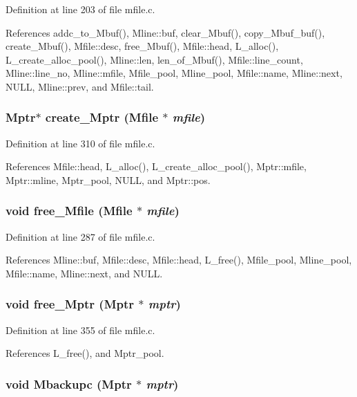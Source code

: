 Definition at line 203 of file mfile.c.

References addc\_\-to\_\-Mbuf(), Mline::buf, clear\_\-Mbuf(), copy\_\-Mbuf\_\-buf(), create\_\-Mbuf(), Mfile::desc, free\_\-Mbuf(), Mfile::head, L\_\-alloc(), L\_\-create\_\-alloc\_\-pool(), Mline::len, len\_\-of\_\-Mbuf(), Mfile::line\_\-count, Mline::line\_\-no, Mline::mfile, Mfile\_\-pool, Mline\_\-pool, Mfile::name, Mline::next, NULL, Mline::prev, and Mfile::tail.
\subsubsection{\setlength{\rightskip}{0pt plus 5cm}\bf{Mptr}$\ast$ create\_\-Mptr (\bf{Mfile} $\ast$ {\em mfile})}\label{mfile_8h_1e4ac468a7c460378f6752e97b392b25}




Definition at line 310 of file mfile.c.

References Mfile::head, L\_\-alloc(), L\_\-create\_\-alloc\_\-pool(), Mptr::mfile, Mptr::mline, Mptr\_\-pool, NULL, and Mptr::pos.
\subsubsection{\setlength{\rightskip}{0pt plus 5cm}void free\_\-Mfile (\bf{Mfile} $\ast$ {\em mfile})}\label{mfile_8h_7da12f4f5725e6715e26a4d50211d759}




Definition at line 287 of file mfile.c.

References Mline::buf, Mfile::desc, Mfile::head, L\_\-free(), Mfile\_\-pool, Mline\_\-pool, Mfile::name, Mline::next, and NULL.
\subsubsection{\setlength{\rightskip}{0pt plus 5cm}void free\_\-Mptr (\bf{Mptr} $\ast$ {\em mptr})}\label{mfile_8h_68642c4e139f1f85fc082dea0fb57369}




Definition at line 355 of file mfile.c.

References L\_\-free(), and Mptr\_\-pool.
\subsubsection{\setlength{\rightskip}{0pt plus 5cm}void Mbackupc (\bf{Mptr} $\ast$ {\em mptr})}\label{mfile_8h_464243e3327e775445c8c26552489906}




